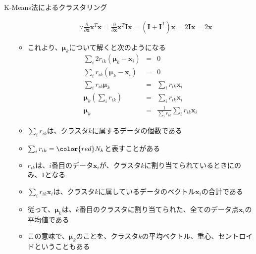 \documentclass[dvipdfmx,notheorems,t]{beamer}
\begin{document}
\begin{frame}{K-Means法によるクラスタリング}
\begin{itemize}
\begin{itemize}
\begin{eqnarray}
			&& \because \frac{\partial}{\partial \bm{x}} \bm{x}^T \bm{x} = \frac{\partial}{\partial \bm{x}} \bm{x}^T \bm{I} \bm{x} = \left( \bm{I} + \bm{I}^T \right) \bm{x} = 2 \bm{I} \bm{x} = 2 \bm{x} \nonumber
		\end{eqnarray}
		\item これより、$\bm{\mu}_k$について解くと次のようになる
		\begin{eqnarray}
			\sum_i 2 r_{ik} (\bm{\mu}_k - \bm{x}_i) &=& 0 \nonumber \\
			\sum_i r_{ik} (\bm{\mu}_k - \bm{x}_i) &=& 0 \nonumber \\
			\sum_i r_{ik} \bm{\mu}_k &=& \sum_i r_{ik} \bm{x}_i \nonumber \\
			\bm{\mu}_k \left( \sum_i r_{ik} \right) &=& \sum_i r_{ik} \bm{x}_i \nonumber \\
			\bm{\mu}_k &=& \frac{1}{\sum_i r_{ik}} \sum_i r_{ik} \bm{x}_i
		\end{eqnarray}
		\item $\sum_i r_{ik}$は、クラスタ$k$に属するデータの個数である
		\item $\sum_i r_{ik} = \color{red} N_k$と表すことがある
		\newline
		\item $r_{ik}$は、$i$番目のデータ$\bm{x}_i$が、クラスタ$k$に割り当てられているときにのみ、$1$となる
		\item $\sum_i r_{ik} \bm{x}_i$は、クラスタ$k$に属しているデータのベクトル$\bm{x}_i$の合計である
		\newline
		\item 従って、$\bm{\mu}_k$は、$k$番目のクラスタに割り当てられた、全てのデータ点$\bm{x}_i$の平均値である
		\newline
		\item この意味で、$\bm{\mu}_k$のことを、クラスタ$k$の\alert{平均ベクトル}、\alert{重心}、\alert{セントロイド}ということもある
	\end{itemize}
\end{itemize}

\end{frame}
\end{document}
